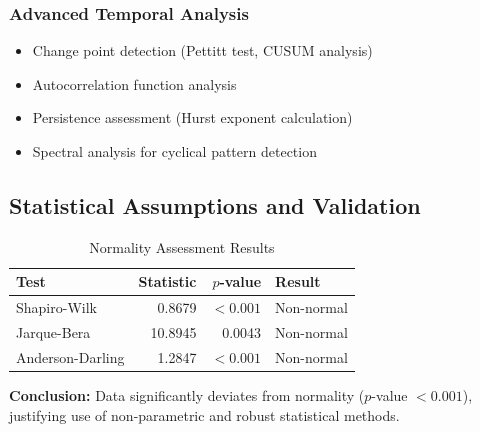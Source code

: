 \documentclass[12pt,a4paper]{article}
\newcommand{\pvalue}{$p$-value}
\begin{document}
\subsubsection{Advanced Temporal Analysis}
\begin{itemize}
    \item Change point detection (Pettitt test, CUSUM analysis)
    \item Autocorrelation function analysis
    \item Persistence assessment (Hurst exponent calculation)
    \item Spectral analysis for cyclical pattern detection
\end{itemize}

\subsection{Statistical Assumptions and Validation}

\begin{table}[H]
\centering
\caption{Normality Assessment Results}
\label{tab:normality_tests}
\begin{tabular}{@{}lrrl@{}}
\toprule
\textbf{Test} & \textbf{Statistic} & \textbf{\pvalue} & \textbf{Result} \\
\midrule
Shapiro-Wilk & 0.8679 & $< 0.001$ & Non-normal \\
Jarque-Bera & 10.8945 & 0.0043 & Non-normal \\
Anderson-Darling & 1.2847 & $< 0.001$ & Non-normal \\
\bottomrule
\end{tabular}
\end{table}

\textbf{Conclusion:} Data significantly deviates from normality (\pvalue{} $< 0.001$), justifying use of non-parametric and robust statistical methods.
\end{document}
